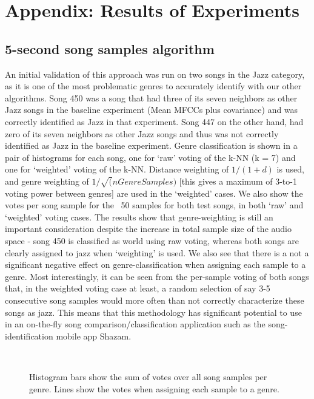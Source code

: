 \documentclass[10pt]{article}
\begin{document}
\section{Appendix: Results of Experiments}
\subsection{5-second song samples algorithm}

An initial validation of this approach was run on two songs in the Jazz category, as it is one of the most problematic genres to accurately identify with our other algorithms.  Song 450 was a song that had three of its seven neighbors as other Jazz songs in the baseline experiment (Mean MFCCs plus covariance) and was correctly identified as Jazz in that experiment.  Song 447 on the other hand, had zero of its seven neighbors as other Jazz songs and thus was not correctly identified as Jazz in the baseline experiment.  Genre classification is shown in a pair of histograms for each song, one for ‘raw’ voting of the k-NN (k = 7) and one for ‘weighted’ voting of the k-NN.  Distance weighting of $1 / (1 + d)$ is used, and genre weighting of $1 / \sqrt(nGenreSamples)$ [this gives a maximum of 3-to-1 voting power between genres] are used in the ‘weighted’ cases.   We also show the votes per song sample for the ~50 samples for both test songs, in both ‘raw’ and ‘weighted’ voting cases.  The results show that genre-weighting is still an important consideration despite the increase in total sample size of the audio space - song 450 is classified as world using raw voting, whereas both songs are clearly assigned to jazz when ‘weighting’ is used.  We also see that there is a not a significant negative effect on genre-classification when assigning each sample to a genre.  Most interestingly, it can be seen from the per-sample voting of both songs that, in the weighted voting case at least, a random selection of say 3-5 consecutive song samples would more often than not correctly characterize these songs as jazz.  This means that this methodology has significant potential to use in an on-the-fly song comparison/classification application such as the song-identification mobile app Shazam.

\begin{figure}[h!]
\\
\caption{Histogram bars show the sum of votes over all song samples per genre.  Lines show the votes when assigning each sample to a genre.}
\label{fig:fivesecond_song_histogram}
\end{figure}
\end{document}
